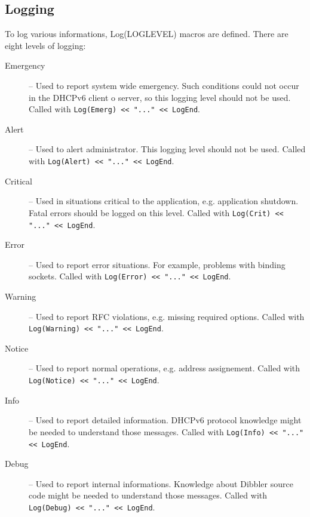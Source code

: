 \subsection{Logging}
To log various informations, Log(LOGLEVEL) macros are defined. There
are eight levels of logging:
\begin{description}
\item[Emergency] -- Used to report system wide emergency. Such
  conditions could not occur in the DHCPv6 client o server, so this
  logging level should not be used. Called with
  \verb+Log(Emerg) << "..." << LogEnd+.

\item[Alert] -- Used to alert administrator. This logging level should
  not be used. Called with \verb+Log(Alert) << "..." << LogEnd+.

\item[Critical] -- Used in situations critical to the application,
  e.g. application shutdown. Fatal errors should be logged on this
  level. Called with \verb+Log(Crit) << "..." << LogEnd+.

\item[Error] -- Used to report error situations. For example, problems
  with binding sockets. Called with \verb+Log(Error) << "..." << LogEnd+.

\item[Warning] -- Used to report RFC violations, e.g. missing required
  options. Called with \verb+Log(Warning) << "..." << LogEnd+.

\item[Notice] -- Used to report normal operations, e.g. address
 assignement. Called with \verb+Log(Notice) << "..." << LogEnd+.

\item[Info] -- Used to report detailed information. DHCPv6 protocol
  knowledge might be needed to understand those messages.
  Called with \verb+Log(Info) << "..." << LogEnd+.

\item[Debug] -- Used to report internal informations. Knowledge about
  Dibbler source code might be needed to understand those messages.
  Called with \verb+Log(Debug) << "..." << LogEnd+.
\end{description}

